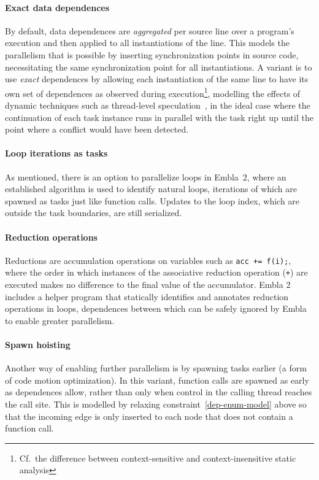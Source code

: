 \paragraph{Exact data dependences}
By default, data dependences are \emph{aggregated} per source line over a
program's execution and then applied to all instantiations of the line.  This
models the parallelism that is possible by inserting synchronization points in
source code, necessitating the same synchronization point for all
instantiations.  A variant is to use \emph{exact} dependences by allowing each
instantiation of the same line to have its own set of dependences as observed
during execution\footnote{Cf.\ the difference between context-sensitive and
context-insensitive static analysis}, modelling the effects of dynamic
techniques such as thread-level
speculation~\cite{Rundberg01anall-software,gregory05stampede}, in the ideal
case where the continuation of each task instance runs in parallel with the
task right up until the point where a conflict would have been detected.

\paragraph{Loop iterations as tasks}
As mentioned, there is an option to parallelize loops in Embla~2,
where an established algorithm \cite{aho86compilers} is used to identify natural loops,
iterations of which are spawned as tasks just like function calls.
Updates to the loop index, which are outside the task boundaries, are still serialized.

\paragraph{Reduction operations}
Reductions are accumulation operations on variables such as \texttt{acc += f(i);},
where the order in which instances of the associative reduction operation ({\tt+})
are executed makes no difference to the final value of the accumulator.
Embla 2 includes a helper program that statically identifies and annotates reduction
operations in loops,
dependences between which can be safely ignored by Embla to enable greater parallelism.

\paragraph{Spawn hoisting}
Another way of enabling further parallelism is by spawning tasks earlier (a form of code motion optimization).
In this variant, function calls are spawned as early as dependences allow,
rather than only when control in the calling thread reaches the call site.
This is modelled by relaxing constraint~\ref{dep-enum-model} above
so that the incoming edge is only inserted to each node that does not contain a
function call.

